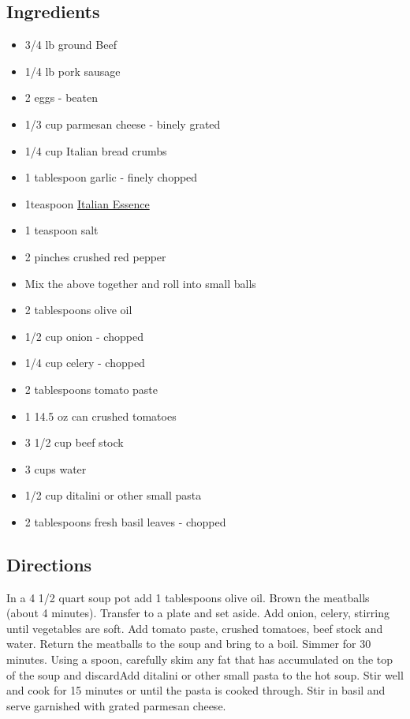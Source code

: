 \documentclass[
]{book}
\providecommand{\tightlist}{%
  \setlength{\itemsep}{0pt}\setlength{\parskip}{0pt}}
\begin{document}
\hypertarget{ingredients-19}{%
\subsection*{Ingredients}\label{ingredients-19}}


\begin{itemize}
\tightlist
\item
  3/4 lb ground Beef
\item
  1/4 lb pork sausage
\item
  2 eggs - beaten
\item
  1/3 cup parmesan cheese - binely grated
\item
  1/4 cup Italian bread crumbs
\item
  1 tablespoon garlic - finely chopped
\item
  1teaspoon \href{https://www.emerils.com/121962/italian-essence}{Italian Essence}
\item
  1 teaspoon salt
\item
  2 pinches crushed red pepper
\item
  Mix the above together and roll into small balls
\item
  2 tablespoons olive oil
\item
  1/2 cup onion - chopped
\item
  1/4 cup celery - chopped
\item
  2 tablespoons tomato paste
\item
  1 14.5 oz can crushed tomatoes
\item
  3 1/2 cup beef stock
\item
  3 cups water
\item
  1/2 cup ditalini or other small pasta
\item
  2 tablespoons fresh basil leaves - chopped
\end{itemize}

\hypertarget{directions-19}{%
\subsection*{Directions}\label{directions-19}}


In a 4 1/2 quart soup pot add 1 tablespoons olive oil. Brown the meatballs (about 4 minutes). Transfer to a plate and set aside. Add onion, celery, stirring until vegetables are soft. Add tomato paste, crushed tomatoes, beef stock and water. Return the meatballs to the soup and bring to a boil. Simmer for 30 minutes. Using a spoon, carefully skim any fat that has accumulated on the top of the soup and discardAdd ditalini or other small pasta to the hot soup. Stir well and cook for 15 minutes or until the pasta is cooked through. Stir in basil and serve garnished with grated parmesan cheese.
\end{document}
